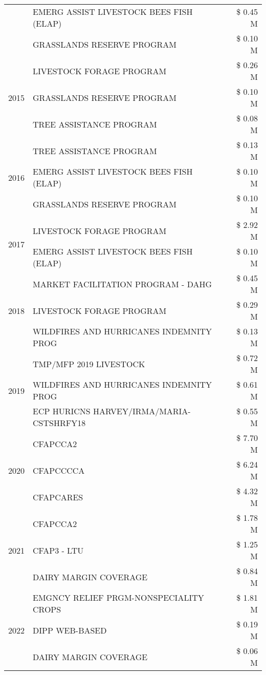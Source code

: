 \begin{tabular}{llr}
 & EMERG ASSIST LIVESTOCK BEES FISH (ELAP) & \$ 0.45 M \\
 & GRASSLANDS RESERVE PROGRAM & \$ 0.10 M \\
\cline{1-3}
\multirow[t]{3}{*}{2015} & LIVESTOCK FORAGE PROGRAM & \$ 0.26 M \\
 & GRASSLANDS RESERVE PROGRAM & \$ 0.10 M \\
 & TREE ASSISTANCE PROGRAM & \$ 0.08 M \\
\cline{1-3}
\multirow[t]{3}{*}{2016} & TREE ASSISTANCE PROGRAM & \$ 0.13 M \\
 & EMERG ASSIST LIVESTOCK BEES FISH (ELAP) & \$ 0.10 M \\
 & GRASSLANDS RESERVE PROGRAM & \$ 0.10 M \\
\cline{1-3}
\multirow[t]{2}{*}{2017} & LIVESTOCK FORAGE PROGRAM & \$ 2.92 M \\
 & EMERG ASSIST LIVESTOCK BEES FISH (ELAP) & \$ 0.10 M \\
\cline{1-3}
\multirow[t]{3}{*}{2018} & MARKET FACILITATION PROGRAM - DAHG & \$ 0.45 M \\
 & LIVESTOCK FORAGE PROGRAM & \$ 0.29 M \\
 & WILDFIRES AND HURRICANES INDEMNITY PROG & \$ 0.13 M \\
\cline{1-3}
\multirow[t]{3}{*}{2019} & TMP/MFP 2019 LIVESTOCK & \$ 0.72 M \\
 & WILDFIRES AND HURRICANES INDEMNITY PROG & \$ 0.61 M \\
 & ECP HURICNS HARVEY/IRMA/MARIA-CSTSHRFY18 & \$ 0.55 M \\
\cline{1-3}
\multirow[t]{3}{*}{2020} & CFAPCCA2 & \$ 7.70 M \\
 & CFAPCCCCA & \$ 6.24 M \\
 & CFAPCARES & \$ 4.32 M \\
\cline{1-3}
\multirow[t]{3}{*}{2021} & CFAPCCA2 & \$ 1.78 M \\
 & CFAP3 - LTU & \$ 1.25 M \\
 & DAIRY MARGIN COVERAGE & \$ 0.84 M \\
\cline{1-3}
\multirow[t]{3}{*}{2022} & EMGNCY RELIEF PRGM-NONSPECIALITY CROPS & \$ 1.81 M \\
 & DIPP WEB-BASED & \$ 0.19 M \\
 & DAIRY MARGIN COVERAGE & \$ 0.06 M \\
\cline{1-3}
\bottomrule
\end{tabular}
